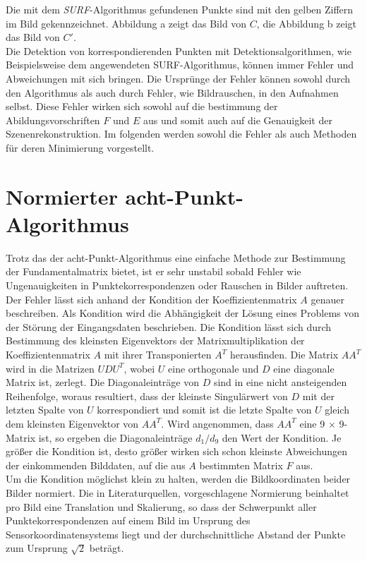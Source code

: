 Die mit dem \textit{SURF}-Algorithmus gefundenen Punkte sind mit den gelben Ziffern im Bild gekennzeichnet. Abbildung a zeigt das Bild von $C$, die Abbildung b zeigt das Bild von $C'$.\\

Die Detektion von korrespondierenden Punkten mit Detektionsalgorithmen, wie Beispielsweise dem angewendeten SURF-Algorithmus, können immer Fehler und Abweichungen mit sich bringen. Die Ursprünge der Fehler können sowohl durch den Algorithmus als auch durch Fehler, wie Bildrauschen, in den Aufnahmen selbst. Diese Fehler wirken sich sowohl auf die bestimmung der Abildungsvorschriften $F$ und $E$ aus und somit auch auf die Genauigkeit der Szenenrekonstruktion\cite{HZ}. Im folgenden werden sowohl die Fehler als auch Methoden für deren Minimierung vorgestellt.

\section{Normierter acht-Punkt-Algorithmus}

Trotz das der acht-Punkt-Algorithmus eine einfache Methode zur Bestimmung der Fundamentalmatrix bietet, ist er sehr unstabil sobald Fehler wie Ungenauigkeiten in Punktekorrespondenzen oder Rauschen in Bilder auftreten\cite{HZ,Brooks}.\\

Der Fehler lässt sich anhand der Kondition der Koeffizientenmatrix $A$ genauer beschreiben. Als Kondition wird die Abhängigkeit der Lösung eines Problems von der Störung der Eingangsdaten beschrieben\cite{HZ8,ConditionNumber}. Die Kondition lässt sich durch Bestimmung des kleinsten Eigenvektors der Matrixmultiplikation der Koeffizientenmatrix $A$ mit ihrer Transponierten $A^T$ herausfinden. Die Matrix $AA^T$ wird in die Matrizen $UDU^T$, wobei $U$ eine orthogonale und $D$ eine diagonale Matrix ist, zerlegt. Die Diagonaleinträge von $D$ sind in eine nicht ansteigenden Reihenfolge, woraus resultiert, dass der kleinste Singulärwert von $D$ mit der letzten Spalte von $U$ korrespondiert und somit ist die letzte Spalte von $U$ gleich dem kleinsten Eigenvektor von $AA^T$\cite{HZ8,ConditionNumber}. Wird angenommen, dass $AA^T$ eine 9 $\times$ 9- Matrix ist, so ergeben die Diagonaleinträge $d_1/d_9$ den Wert der Kondition. Je größer die Kondition ist, desto größer wirken sich schon kleinste Abweichungen der einkommenden Bilddaten, auf die aus $A$ bestimmten Matrix $F$ aus.\\

Um die Kondition möglichst klein zu halten, werden die Bildkoordinaten beider Bilder normiert. Die in Literaturquellen, vorgeschlagene Normierung beinhaltet pro Bild eine Translation und Skalierung, so dass der Schwerpunkt aller Punktekorrespondenzen auf einem Bild im Ursprung des Sensorkoordinatensystems liegt und der durchschnittliche Abstand der Punkte zum Ursprung $\sqrt{2}$ beträgt\cite{HZ,Ferid,Brooks}.\\


